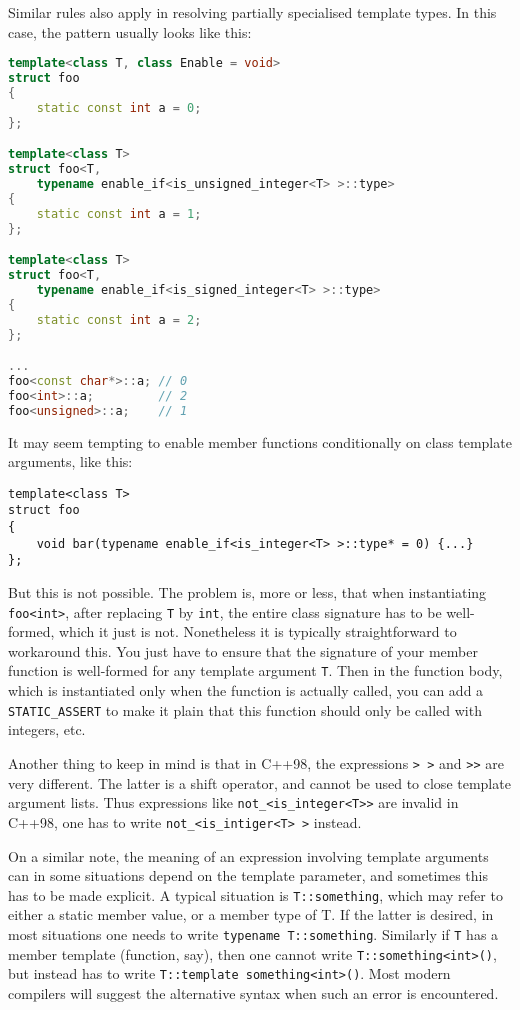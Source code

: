 \documentclass[a4paper,10pt]{book}
\newcommand{\code}{\lstinline}
\begin{document}
{{Similar rules also apply in resolving partially specialised template types. In
this case, the pattern usually looks like this:

\begin{lstlisting}[language=c++]
template<class T, class Enable = void>
struct foo
{
    static const int a = 0;
};

template<class T>
struct foo<T,
    typename enable_if<is_unsigned_integer<T> >::type>
{
    static const int a = 1;
};

template<class T>
struct foo<T,
    typename enable_if<is_signed_integer<T> >::type>
{
    static const int a = 2;
};

...
foo<const char*>::a; // 0
foo<int>::a;         // 2
foo<unsigned>::a;    // 1
\end{lstlisting}

It may seem tempting to enable member functions conditionally on class template
arguments, like this:

\begin{lstlisting}
template<class T>
struct foo
{
    void bar(typename enable_if<is_integer<T> >::type* = 0) {...}
};
\end{lstlisting}

But this is not possible. The problem is, more or less,
that when instantiating \code{foo<int>}, after replacing \code{T} by \code{int},
the entire class signature has to be well-formed, which it just is not.
Nonetheless it is typically straightforward to workaround this. You just have to
ensure that the signature of your member function is well-formed for any
template argument \code{T}. Then in the function body, which is instantiated
only when the function is actually called, you can add a \code{STATIC_ASSERT} to
make it plain that this function should only be called with integers, etc.

Another thing to keep in mind is that in C++98, the expressions \code{> >} and
\code{>>} are very different. The latter is a shift operator, and cannot be used
to close template argument lists. Thus expressions like
\code{not_<is_integer<T>>} are invalid in C++98, one has to write
\code{not_<is_intiger<T> >} instead.

On a similar note, the meaning of an expression involving template arguments can
in some situations depend on the template parameter, and sometimes this has to
be made explicit. A typical situation is \code{T::something}, which may refer to
either a static member value, or a member type of T. If the latter is desired,
in most situations one needs to write \code{typename T::something}. Similarly if
\code{T} has a member template (function, say), then one cannot write
\code{T::something<int>()}, but instead has to write
\code{T::template something<int>()}. Most modern compilers will suggest the
alternative syntax when such an error is encountered.

}}
\end{document}
